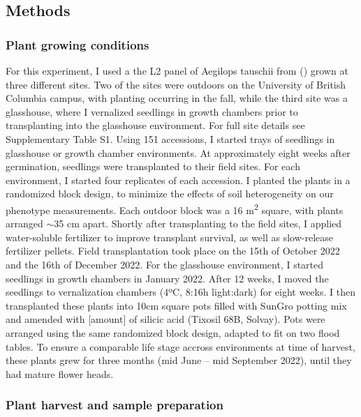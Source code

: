\documentclass[12pt, letterpaper, ]{article}
\begin{document}
\subsection{Methods}

\subsubsection{Plant growing conditions}

For this experiment, I used a the L2 panel of Aegilops tauschii from (\cite{gaurav_population_2021}) grown at three different sites. Two of the sites were outdoors on the University of British Columbia campus, with planting occurring in the fall, while the third site was a glasshouse, where I vernalized seedlings in growth chambers prior to transplanting into the glasshouse environment. For full site details see Supplementary Table S1. Using 151 accessions, I started trays of seedlings in glasshouse or growth chamber environments. At approximately eight weeks after germination, seedlings were transplanted to their field sites. For each environment, I started four replicates of each accession. I planted the plants in a randomized block design, to minimize the effects of soil heterogeneity on our phenotype measurements. Each outdoor block was a 16 m\textsuperscript{2} square, with plants arranged $\sim$35 cm apart. Shortly after transplanting to the field sites, I applied water-soluble fertilizer to improve transplant survival, as well as slow-release fertilizer pellets. Field transplantation took place on the 15th of October 2022 and the 16th of December 2022. For the glasshouse environment, I started seedlings in growth chambers in January 2022. After 12 weeks, I moved the seedlings to vernalization chambers (4ºC, 8:16h light:dark) for eight weeks. I then transplanted these plants into 10cm square pots filled with SunGro potting mix and amended with [amount] of silicic acid (Tixosil 68B, Solvay). Pots were arranged using the same randomized block design, adapted to fit on two flood tables. To ensure a comparable life stage accross environments at time of harvest, these plants grew for three months (mid June – mid September 2022), until they had mature flower heads. 

\subsubsection{Plant harvest and sample preparation}
\end{document}
